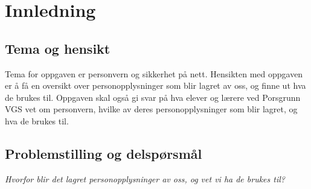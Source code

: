 \section{Innledning}

\subsection{Tema og hensikt}
Tema for oppgaven er personvern og sikkerhet på nett. Hensikten med oppgaven er å få en oversikt over personopplysninger som blir lagret av oss, og finne ut hva de brukes til. Oppgaven skal også gi svar på hva elever og lærere ved Porsgrunn VGS vet om personvern, hvilke av deres personopplysninger som blir lagret, og hva de brukes til.

\subsection{Problemstilling og delspørsmål}

\textit{Hvorfor blir det lagret personopplysninger av oss, og vet vi ha de brukes til?}




\newpage